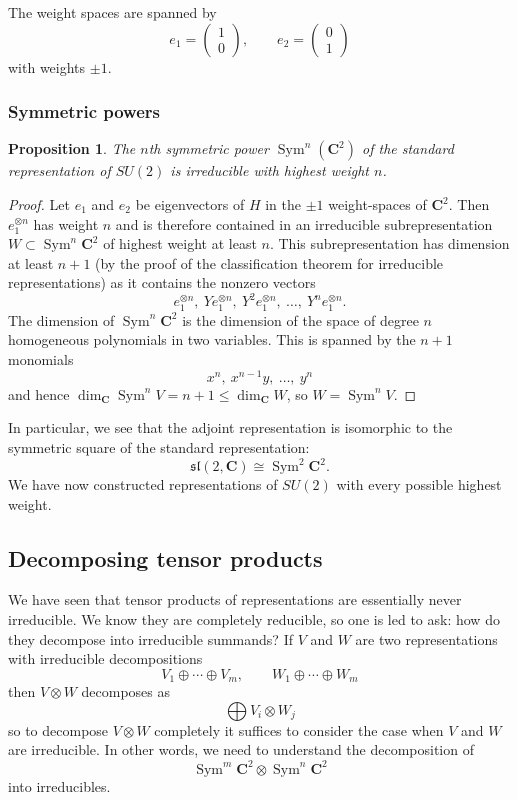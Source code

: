 \documentclass[12pt]{article}
\newcommand{\CC}{\mathbf{C}}
\newcommand{\OP}{\operatorname}
\newcommand{\Sym}{\OP{Sym}}
\newtheorem{prp}[thm]{Proposition}
\theoremstyle{definition}
\theoremstyle{check}
\theoremstyle{remark}
\theoremstyle{TheoremNum}
\begin{document}
The weight spaces are spanned by
\[e_1=\left(\begin{array}{c}1 \\ 0\end{array}\right),\qquad e_2=\left(\begin{array}{c}0 \\ 1\end{array}\right)\]
with weights $\pm 1$.

\subsubsection{Symmetric powers}

\begin{prp}\label{prp-symmetric-powers-su2}
The $n$th symmetric power $\Sym^n(\CC^2)$ of the standard representation of $SU(2)$ is irreducible with highest weight $n$.
\end{prp}
\begin{proof}
Let $e_1$ and $e_2$ be eigenvectors of $H$ in the $\pm 1$ weight-spaces of $\CC^2$. Then $e_1^{\otimes n}$ has weight $n$ and is therefore contained in an irreducible subrepresentation $W\subset\Sym^n\CC^2$ of highest weight at least $n$. This subrepresentation has dimension at least $n+1$ (by the proof of the classification theorem for irreducible representations) as it contains the nonzero vectors
\[e_1^{\otimes n},\ Ye_1^{\otimes n},\ Y^2e_1^{\otimes n},\ \ldots,\ Y^ne_1^{\otimes n}.\]
The dimension of $\Sym^n\CC^2$ is the dimension of the space of degree $n$ homogeneous polynomials in two variables. This is spanned by the $n+1$ monomials
\[x^n,\ x^{n-1}y,\ \ldots,\ y^n\]
and hence $\dim_{\CC}\Sym^nV=n+1\leq\dim_{\CC}W$, so $W=\Sym^nV$.
\end{proof}

In particular, we see that the adjoint representation is isomorphic to the symmetric square of the standard representation:
\[\mathfrak{sl}(2,\CC)\cong\Sym^2\CC^2.\]
We have now constructed representations of $SU(2)$ with every possible highest weight.

\subsection{Decomposing tensor products}

We have seen that tensor products of representations are essentially never irreducible. We know they are completely reducible, so one is led to ask: how do they decompose into irreducible summands? If $V$ and $W$ are two representations with irreducible decompositions
\[V_1\oplus\cdots\oplus V_m,\qquad W_1\oplus\cdots\oplus W_m\]
then $V\otimes W$ decomposes as
\[\bigoplus V_i\otimes W_j\]
so to decompose $V\otimes W$ completely it suffices to consider the case when $V$ and $W$ are irreducible. In other words, we need to understand the decomposition of
\[\Sym^m\CC^2\otimes\Sym^n\CC^2\]
into irreducibles.
\end{document}

